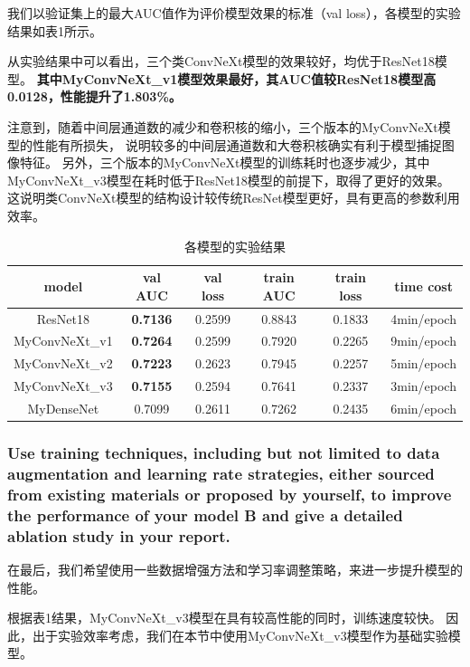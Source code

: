 \documentclass[12pt, a4paper]{article}
\begin{document}
        我们以验证集上的最大AUC值作为评价模型效果的标准（val loss），各模型的实验结果如表1所示。

        从实验结果中可以看出，三个类ConvNeXt模型的效果较好，均优于ResNet18模型。
        \textbf{其中MyConvNeXt\_v1模型效果最好，其AUC值较ResNet18模型高0.0128，性能提升了1.803\%。}

        注意到，随着中间层通道数的减少和卷积核的缩小，三个版本的MyConvNeXt模型的性能有所损失，
        说明较多的中间层通道数和大卷积核确实有利于模型捕捉图像特征。
        另外，三个版本的MyConvNeXt模型的训练耗时也逐步减少，其中MyConvNeXt\_v3模型在耗时低于ResNet18模型的前提下，取得了更好的效果。
        这说明类ConvNeXt模型的结构设计较传统ResNet模型更好，具有更高的参数利用效率。

        \begin{table}[htbp]
        \caption{各模型的实验结果}
        \centering
        \begin{tabular}{cccccc}
            \toprule
            model           & val AUC          & val loss & train AUC & train loss & time cost  \\
            \midrule
            ResNet18        & \textbf{0.7136}  & 0.2599   & 0.8843    & 0.1833     & 4min/epoch \\
            MyConvNeXt\_v1  & \textbf{0.7264}  & 0.2599   & 0.7920    & 0.2265     & 9min/epoch \\
            MyConvNeXt\_v2  & \textbf{0.7223}  & 0.2623   & 0.7945    & 0.2257     & 5min/epoch \\
            MyConvNeXt\_v3  & \textbf{0.7155}  & 0.2594   & 0.7641    & 0.2337     & 3min/epoch \\
            MyDenseNet      & 0.7099           & 0.2611   & 0.7262    & 0.2435     & 6min/epoch
        \end{tabular}
        \end{table}

    \subsubsection{Use training techniques, including but not limited to data augmentation and learning rate strategies, either sourced from existing materials or proposed by yourself, to improve the performance of your model B and give a detailed ablation study in your report.}

        在最后，我们希望使用一些数据增强方法和学习率调整策略，来进一步提升模型的性能。

        根据表1结果，MyConvNeXt\_v3模型在具有较高性能的同时，训练速度较快。
        因此，出于实验效率考虑，我们在本节中使用MyConvNeXt\_v3模型作为基础实验模型。
\end{document}
